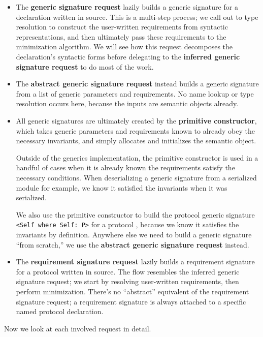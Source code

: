 \documentclass[../generics]{subfiles}
\begin{document}
\begin{itemize}
\item The \textbf{generic signature request} lazily builds a generic signature for a declaration written in source. This is a multi-step process; we call out to type resolution to construct the user-written requirements from syntactic representations, and then ultimately pass these requirements to the minimization algorithm. We will see how this request decomposes the declaration's syntactic forms before delegating to the \textbf{inferred generic signature request} to do most of the work.
\item The \textbf{abstract generic signature request} instead builds a generic signature from a list of generic parameters and requirements. No name lookup or type resolution occurs here, because the inputs are semantic objects already.
\item All generic signatures are ultimately created by the \textbf{primitive constructor}, which takes generic parameters and requirements known to already obey the necessary invariants, and simply allocates and initializes the semantic object.

Outside of the generics implementation, the primitive constructor is used in a handful of cases when it is already known the requirements satisfy the necessary conditions. When deserializing a generic signature from a serialized module for example, we know it satisfied the invariants when it was serialized.

We also use the primitive constructor to build the protocol generic signature \verb|<Self where Self: P>| for a protocol \tP, because we know it satisfies the invariants by definition. Anywhere else we need to build a generic signature ``from scratch,'' we use the \textbf{abstract generic signature request} instead.

\item The \textbf{requirement signature request} lazily builds a requirement signature for a protocol written in source. The flow resembles the inferred generic signature request; we start by resolving user-written requirements, then perform minimization. There's no ``abstract'' equivalent of the requirement signature request; a requirement signature is always attached to a specific named protocol declaration.
\end{itemize}
Now we look at each involved request in detail.
\end{document}
